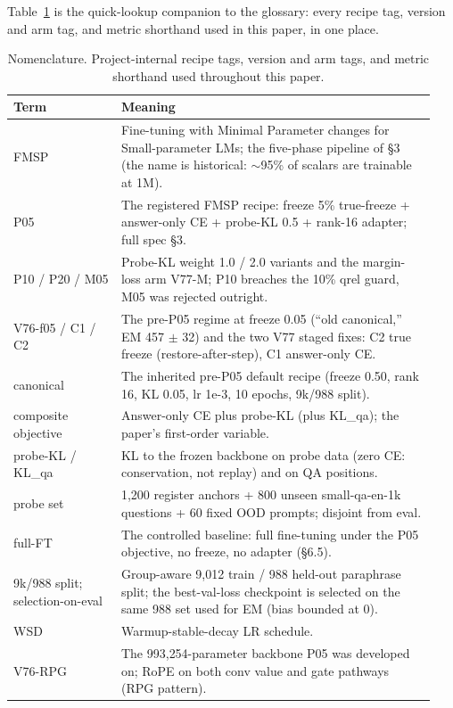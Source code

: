 \documentclass[11pt]{article}
\begin{document}
Table~\ref{tab:nomenclature} is the quick-lookup companion to the glossary: every recipe tag, version and arm tag, and metric shorthand used in this paper, in one place.

\begin{table}[!t]
\centering
\footnotesize
\caption{Nomenclature. Project-internal recipe tags, version and arm tags, and metric shorthand used throughout this paper.}
\label{tab:nomenclature}
\begin{tabular}{p{0.24\linewidth} p{0.70\linewidth}}
\toprule
Term & Meaning \\
\midrule
FMSP & Fine-tuning with Minimal Parameter changes for Small-parameter LMs; the five-phase pipeline of \S3 (the name is historical: $\sim$95\% of scalars are trainable at 1M). \\
P05 & The registered FMSP recipe: freeze 5\% true-freeze + answer-only CE + probe-KL 0.5 + rank-16 adapter; full spec \S3. \\
P10 / P20 / M05 & Probe-KL weight 1.0 / 2.0 variants and the margin-loss arm V77-M; P10 breaches the 10\% qrel guard, M05 was rejected outright. \\
V76-f05 / C1 / C2 & The pre-P05 regime at freeze 0.05 (``old canonical,'' EM 457 $\pm$ 32) and the two V77 staged fixes: C2 true freeze (restore-after-step), C1 answer-only CE. \\
canonical & The inherited pre-P05 default recipe (freeze 0.50, rank 16, KL 0.05, lr 1e-3, 10 epochs, 9k/988 split). \\
composite objective & Answer-only CE plus probe-KL (plus KL\_qa); the paper's first-order variable. \\
probe-KL / KL\_qa & KL to the frozen backbone on probe data (zero CE: conservation, not replay) and on QA positions. \\
probe set & 1{,}200 register anchors + 800 unseen small-qa-en-1k questions + 60 fixed OOD prompts; disjoint from eval. \\
full-FT & The controlled baseline: full fine-tuning under the P05 objective, no freeze, no adapter (\S6.5). \\
9k/988 split; selection-on-eval & Group-aware 9{,}012 train / 988 held-out paraphrase split; the best-val-loss checkpoint is selected on the same 988 set used for EM (bias bounded at 0). \\
WSD & Warmup-stable-decay LR schedule. \\
\midrule
V76-RPG & The 993{,}254-parameter backbone P05 was developed on; RoPE on both conv value and gate pathways (RPG pattern). \\

\end{tabular}
\end{table}
\end{document}
